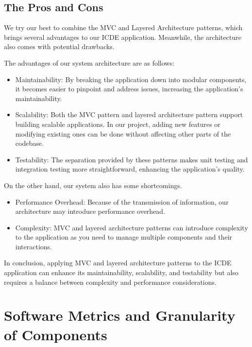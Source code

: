 \documentclass[conference]{IEEEtran}
\begin{document}
\subsection{\textbf{The Pros and Cons}}

We try our best to combine the MVC and Layered Architecture patterns, which brings several advantages to our ICDE application. Meanwhile, the architecture also comes with potential drawbacks.

The advantages of our system architecture are as follows:

\begin{itemize}
    \item Maintainability: By breaking the application down into modular components, it becomes easier to pinpoint and address issues, increasing the application's maintainability.

    \item Scalability:  Both the MVC pattern and layered architecture pattern support building scalable applications. In our project, adding new features or modifying existing ones can be done without affecting other parts of the codebase.

    \item Testability: The separation provided by these patterns makes unit testing and integration testing more straightforward, enhancing the application's quality.

\end{itemize}

On the other hand, our system also has some shortcomings.

\begin{itemize}
    \item Performance Overhead: Because of the transmission of information, our architecture may introduce performance overhead.

    \item Complexity:  MVC and layered architecture patterns can introduce complexity to the application as you need to manage multiple components and their interactions.

\end{itemize}

In conclusion, applying MVC and layered architecture patterns to the ICDE application can enhance its maintainability, scalability, and testability but also requires a balance between complexity and performance considerations.


\section{\textbf{Software Metrics and Granularity of Components}}
\end{document}
